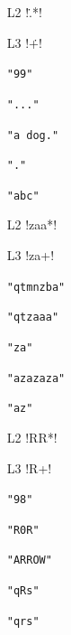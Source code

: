 \begin{footnotesize}
\vspace{-5mm}
\begin{multicols}{3}
\begin{itemize}[noitemsep,topsep=0pt]
\item[L2] \cverb!\..*!
\item[L3] \cverb!\.+!
\item[] \verb|"99"|
\item[] \verb|"..."|
\item[] \verb|"a dog."|
\item[] \verb|"."|
\item[] \verb|"abc"|
\item[L2] \cverb!zaa*!
\item[L3] \cverb!za+!
\item[] \verb|"qtmnzba"|
\item[] \verb|"qtzaaa"|
\item[] \verb|"za"|
\item[] \verb|"azazaza"|
\item[] \verb|"az"|
\item[L2] \cverb!RR*!
\item[L3] \cverb!R+!
\item[] \verb|"98"|
\item[] \verb|"R0R"|
\item[] \verb|"ARROW"|
\item[] \verb|"qRs"|
\item[] \verb|"qrs"|
\end{itemize}
\end{multicols}
\pagebreak


\end{footnotesize}
